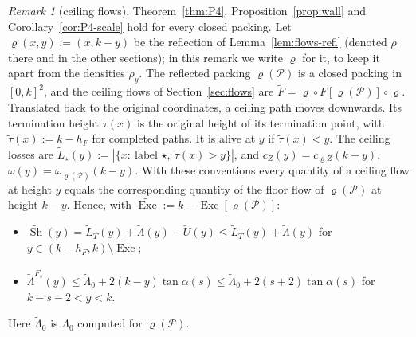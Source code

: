 \documentclass[11pt]{amsart}
\newcommand{\cP}{\mathcal P}
\newcommand{\Sh}{\operatorname{Sh}}
\newcommand{\Exc}{\operatorname{Exc}}
\newcommand{\Lam}{\Lambda}
\theoremstyle{definition}
\theoremstyle{remark}
\newtheorem{remark}[theorem]{Remark}
\numberwithin{equation}{section}
\begin{document}
\begin{remark}[ceiling flows]\label{rem:P4-ceiling}
Theorem~\ref{thm:P4}, Proposition~\ref{prop:wall} and Corollary~\ref{cor:P4-scale} hold for every closed packing. Let $\varrho(x,y):=(x,k-y)$ be the reflection of Lemma~\ref{lem:flows-refl} (denoted $\rho$ there and in the other sections); in this remark we write $\varrho$ for it, to keep it apart from the densities $\rho_y$. The reflected packing $\varrho(\cP)$ is a closed packing in $[0,k]^2$, and the ceiling flows of Section~\ref{sec:flows} are $\tilde F=\varrho\circ F[\varrho(\cP)]\circ\varrho$. Translated back to the original coordinates, a ceiling path moves downwards. Its termination height $\tilde\tau(x)$ is the original height of its termination point, with $\tilde\tau(x):=k-h_F$ for completed paths. It is alive at $y$ if $\tilde\tau(x)<y$. The ceiling losses are $\tilde L_\star(y):=|\{x:\ \text{label }\star,\ \tilde\tau(x)>y\}|$, and $c_Z(y)=c_{\varrho Z}(k-y)$, $\omega(y)=\omega_{\varrho(\cP)}(k-y)$. With these conventions every quantity of a ceiling flow at height $y$ equals the corresponding quantity of the floor flow of $\varrho(\cP)$ at height $k-y$. Hence, with $\widetilde{\Exc}:=k-\Exc[\varrho(\cP)]$:
\begin{itemize}
\item $\widetilde{\Sh}(y)=\tilde L_T(y)+\tilde\Lam(y)-\tilde U(y)\le\tilde L_T(y)+\tilde\Lam(y)$ for $y\in(k-h_F,k)\setminus\widetilde{\Exc}$;
\item $\tilde\Lam^{\tilde F_s}(y)\le\tilde\Lam_0+2(k-y)\tan\alpha(s)\le\tilde\Lam_0+2(s+2)\tan\alpha(s)$ for $k-s-2<y<k$.
\end{itemize}
Here $\tilde\Lam_0$ is $\Lam_0$ computed for $\varrho(\cP)$.
\end{remark}
\end{document}
